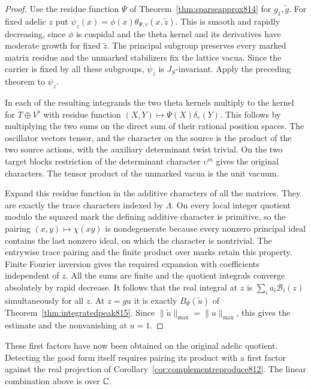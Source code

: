 \documentclass[a4paper,11pt]{article}
\theoremstyle{definition}
\theoremstyle{remark}
\numberwithin{equation}{section}
\begin{document}
\begin{proof}
Use the residue function \(\Psi\) of
Theorem~\ref{thm:sparseapprox814} for \(g_1,\widetilde g\).
For fixed adelic \(z\) put
\(\psi_z(x)=\phi(x)\theta_{\Psi,v}(x,\widetilde z)\).
This is smooth and rapidly decreasing, since \(\phi\)
is cuspidal and the theta kernel and its derivatives have
moderate growth for fixed \(\widetilde z\). The principal
subgroup preserves every marked matrix residue and the
unmarked stabilizers fix the lattice vacua. Since the
carrier is fixed by all these subgroups, \(\psi_z\) is
\(J_S\)-invariant.
Apply the preceding theorem to \(\psi_z\).

In each of the resulting integrands the two theta kernels
multiply to the kernel for \(T\oplus V^\flat\) with residue
function \((X,Y)\mapsto\Psi(X)\delta_e(Y)\). This follows
by multiplying the two sums on the direct sum of their
rational position spaces. The oscillator vectors tensor,
and the character on the source is the product of the
two source actions, with the auxiliary determinant twist
trivial. On the two target blocks restriction of the
determinant character \(\upsilon^m\) gives the original
characters. The tensor product of the unmarked vacua
is the unit vacuum.

Expand this residue function in the additive characters
of all the matrices. They are exactly the trace characters
indexed by \(\Lambda\). On every local integer quotient
modulo the squared mark the defining additive character
is primitive, so the pairing \((x,y)\mapsto\chi(xy)\)
is nondegenerate because every nonzero principal ideal contains
the last nonzero ideal, on which the character is nontrivial.
The entrywise trace pairing and the finite product over
marks retain this property. Finite Fourier inversion gives
the required expansion with coefficients independent of
\(z\). All the sums are finite and the quotient integrals
converge absolutely by rapid decrease. It follows that
the real integral at \(z\) is \(\sum_i a_i\mathcal B_i(z)\)
simultaneously for all \(z\). At \(z=gu\) it is exactly
\(B_\Psi(\widetilde u)\) of Theorem~\ref{thm:integratedpeak815}.
Since \(\|\widetilde u\|_{\max}=\|u\|_{\max}\), this gives the
estimate and the nonvanishing at \(u=1\).
\end{proof}

These first factors have now been obtained on the original
adelic quotient. Detecting the good form itself requires
pairing its product with a first factor against the real
projection of Corollary~\ref{cor:complementreproduce812}.
The linear combination above is over \(\mathbb C\).
\clearpage
\end{document}

